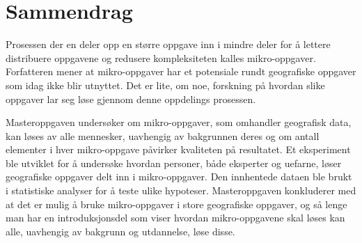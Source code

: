 

\chapter*{Sammendrag}
%

Prosessen der en deler opp en større oppgave inn i mindre deler for å lettere distribuere oppgavene og redusere kompleksiteten kalles mikro-oppgaver. Forfatteren mener at mikro-oppgaver har et potensiale rundt geografiske oppgaver som idag ikke blir utnyttet. Det er lite, om noe,  forskning på hvordan slike oppgaver lar seg løse gjennom denne oppdelings prosessen. 

Masteroppgaven undersøker om mikro-oppgaver, som omhandler geografisk data, kan løses av alle mennesker, uavhengig av bakgrunnen deres og om antall elementer i hver mikro-oppgave påvirker kvaliteten på resultatet. Et eksperiment ble utviklet for å undersøke hvordan personer, både eksperter og uefarne, løser geografiske oppgaver delt inn i mikro-oppgaver. Den innhentede dataen ble brukt i statistiske analyser for å teste ulike hypoteser. Masteroppgaven konkluderer med at det er mulig å bruke mikro-oppgaver i store geografiske oppgaver, og så lenge man har en introduksjonsdel som viser hvordan mikro-oppgavene skal løses kan alle, uavhengig av bakgrunn og utdannelse, løse disse.


